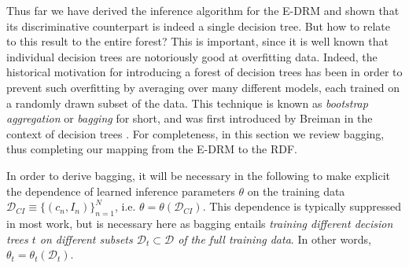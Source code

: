 \documentclass[12pt]{article}
\newcommand{\D}[0]{{ \mathcal{D} }}
\begin{document}
Thus far we have derived the inference algorithm for the E-DRM and shown that its discriminative counterpart is indeed a single decision tree. But how to relate to this result to the entire forest? This is important, since it is well known that individual decision trees are notoriously good at overfitting data. Indeed, the historical motivation for introducing a forest of decision trees has been in order to prevent such overfitting by averaging over many different models, each trained on a randomly drawn subset of the data. This technique is known as \emph{bootstrap aggregation} or \emph{bagging} for short, and was first introduced by Breiman in the context of decision trees \cite{breiman2001random}. For completeness, in this section we review bagging, thus completing our mapping from the E-DRM to the RDF.

In order to derive bagging, it will be necessary in the following to make explicit the dependence of learned inference parameters $\theta$ on the training data $\D_{CI} \equiv \{ (c_{n}, I_{n}) \}_{n=1}^{N}$, i.e. $\theta = \theta(\D_{CI})$. This dependence is typically suppressed in most work, but is necessary here as bagging entails \emph{training different decision trees $t$ on different subsets $\D_t \subset \D$ of the full training data}. In other words, $\theta_t = \theta_t(\D_t)$. 
\end{document}

